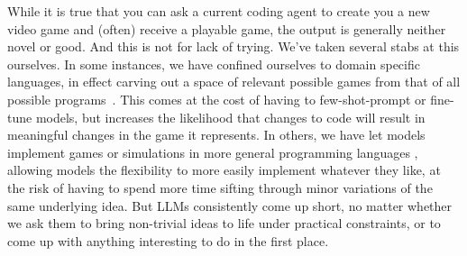 \documentclass[runningheads]{llncs}
\begin{document}
While it is true that you can ask a current coding agent to create you a new video game and (often) receive a playable game, the output is generally neither novel or good. And this is not for lack of trying. We've taken several stabs at this ourselves. In some instances, we have confined ourselves to domain specific languages, in effect carving out a space of relevant possible games from that of all possible programs~\cite{todd2024gavel,earle2025scriptdoctor,nasir2024word2world}. This comes at the cost of having to few-shot-prompt or fine-tune models, but increases the likelihood that changes to code will result in meaningful changes in the game it represents. In others, we have let models implement games or simulations in more general programming languages \cite{nasir2025mortarevolvingmechanicsautomatic,earle2025dreamgarden}, allowing models the flexibility to more easily implement whatever they like, at the risk of having to spend more time sifting through minor variations of the same underlying idea. But LLMs consistently come up short, no matter whether we ask them to bring non-trivial ideas to life under practical constraints,
or to come up with anything interesting to do in the first place.

\end{document}
